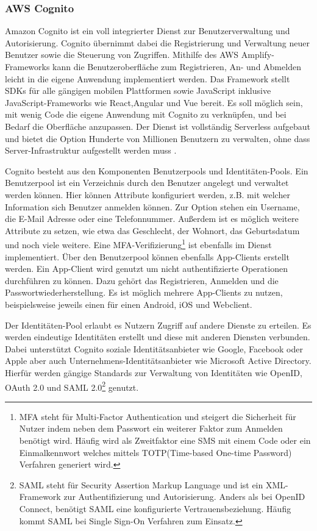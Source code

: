 {\subsubsection{AWS Cognito}
\label{Cognito}
Amazon Cognito ist ein voll integrierter Dienst zur Benutzerverwaltung und Autorisierung.
Cognito übernimmt dabei die Registrierung und Verwaltung neuer Benutzer sowie die Steuerung von Zugriffen.
Mithilfe des AWS Amplify-Frameworks kann die Benutzeroberfläche zum Registrieren, An- und Abmelden leicht in die eigene Anwendung implementiert werden.
Das Framework stellt SDKs für alle gängigen mobilen Plattformen sowie JavaScript inklusive JavaScript-Frameworks wie React,Angular und Vue bereit.
Es soll möglich sein, mit wenig Code die eigene Anwendung mit Cognito zu verknüpfen, und bei Bedarf die Oberfläche anzupassen.
Der Dienst ist vollständig Serverless aufgebaut und bietet die Option \glqq Hunderte von Millionen Benutzern\grqq{} zu verwalten,
\glqq ohne dass Server-Infrastruktur aufgestellt werden muss\grqq{} \cite[]{CognitoUebersicht}. \cite[]{Cognito2}

Cognito besteht aus den Komponenten Benutzerpools und Identitäten-Pools.
Ein Benutzerpool ist ein Verzeichnis durch den Benutzer angelegt und verwaltet werden können.
Hier können Attribute konfiguriert werden, z.B. mit welcher Information sich Benutzer anmelden können.
Zur Option stehen ein Username, die E-Mail Adresse oder eine Telefonnummer.
Außerdem ist es möglich weitere Attribute zu setzen, wie etwa das Geschlecht, der Wohnort, das Geburtsdatum und noch viele weitere.
Eine MFA-Verifizierung\footnote{MFA steht für Multi-Factor Authentication und steigert die Sicherheit für Nutzer indem neben dem Passwort
ein weiterer Faktor zum Anmelden benötigt wird. Häufig wird als Zweitfaktor eine SMS mit einem Code oder
ein Einmalkennwort welches mittels TOTP(Time-based One-time Password) Verfahren generiert wird. } ist ebenfalls im Dienst implementiert.
Über den Benutzerpool können ebenfalls App-Clients erstellt werden.
Ein App-Client wird genutzt um nicht authentifizierte Operationen durchführen zu können.
Dazu gehört das Registrieren, Anmelden und die Passwortwiederherstellung.
Es ist möglich mehrere App-Clients zu nutzen, beispielsweise jeweils einen für einen Android, iOS und Webclient.

Der Identitäten-Pool erlaubt es Nutzern Zugriff auf andere Dienste zu erteilen. Es werden eindeutige Identitäten erstellt und diese mit anderen Diensten verbunden.
Dabei unterstützt Cognito soziale Identitätsanbieter wie Google, Facebook oder Apple aber auch Unternehmens-Identitätsanbieter wie Microsoft Active Directory.
Hierfür werden gängige Standards zur Verwaltung von Identitäten wie OpenID, OAuth 2.0 und SAML 2.0\footnote{SAML steht für Security Assertion Markup Language und ist ein XML-Framework zur  Authentifizierung und Autorisierung.
Anders als bei OpenID Connect, benötigt SAML eine konfigurierte Vertrauensbeziehung. Häufig kommt SAML bei Single Sign-On Verfahren zum Einsatz. } genutzt. \cite[]{Cognito1}

}
